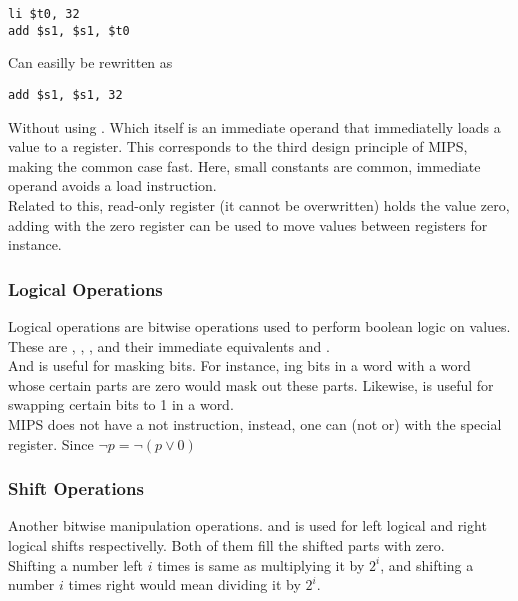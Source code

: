\documentclass[11pt,a4paper,twocolumn]{book}
\begin{document}
\begin{lstlisting}
li $t0, 32
add $s1, $s1, $t0
\end{lstlisting}

Can easilly be rewritten as

\begin{lstlisting}
add $s1, $s1, 32
\end{lstlisting}

Without using . Which itself is an immediate operand that immediatelly loads a value to a register. This corresponds to the third design principle of MIPS, making the common case fast. Here, small constants are common, immediate operand avoids a load instruction.\\

Related to this,  read-only register (it cannot be overwritten) holds the value zero, adding with the zero register can be used to move values between registers for instance.

\subsubsection{Logical Operations}

Logical operations are bitwise operations used to perform boolean logic on values. These are , , , and their immediate equivalents  and .\\

And is useful for masking bits. For instance, ing bits in a word with a word whose certain parts are zero would mask out these parts. Likewise,  is useful for swapping certain bits to 1 in a word.\\

MIPS does not have a not instruction, instead, one can  (not or) with the special  register. Since $\lnot p = \lnot (p \lor 0)$

 
\subsubsection{Shift Operations}

Another bitwise manipulation operations.  and  is used for left logical and right logical shifts respectivelly. Both of them fill the shifted parts with zero.\\

Shifting a number left $i$ times is same as multiplying it by $2^i$, and shifting a number $i$ times right would mean dividing it by $2^i$.
\end{document}
